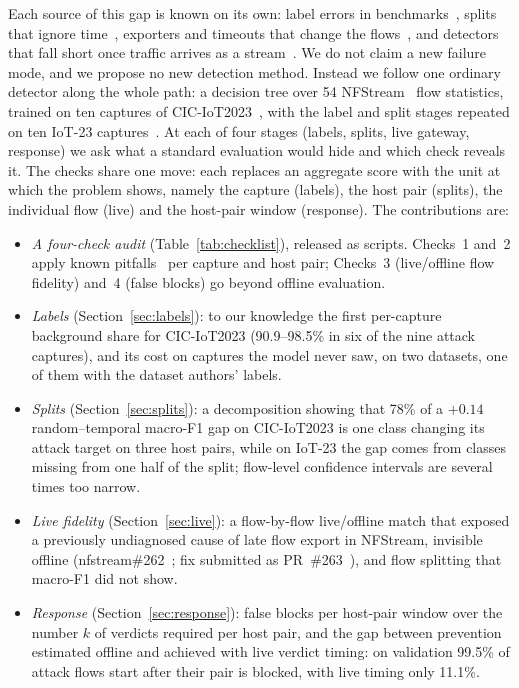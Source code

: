 Each source of this gap is known on its own: label errors in benchmarks~\cite{engelen2021troubleshooting,liu2022error,lanvin2023errors,flood2024smells}, splits that ignore time~\cite{pendlebury2019tesseract,arp2022dos,andresini2021insomnia}, exporters and timeouts that change the flows~\cite{velan2020impact,pinto2025flowexporter}, and detectors that fall short once traffic arrives as a stream~\cite{pekar2025early,zhao2026gidseval}. We do not claim a new failure mode, and we propose no new detection method. Instead we follow one ordinary detector along the whole path: a decision tree over 54 NFStream~\cite{aouini2022nfstream} flow statistics, trained on ten captures of CIC-IoT2023~\cite{neto2023ciciot2023}, with the label and split stages repeated on ten IoT-23 captures~\cite{garcia2020iot23}. At each of four stages (labels, splits, live gateway, response) we ask what a standard evaluation would hide and which check reveals it. The checks share one move: each replaces an aggregate score with the unit at which the problem shows, namely the capture (labels), the host pair (splits), the individual flow (live) and the host-pair window (response). The contributions are:
\begin{itemize}
\item \emph{A four-check audit} (Table~\ref{tab:checklist}), released as scripts. Checks~1 and~2 apply known pitfalls~\cite{arp2022dos,flood2024smells} per capture and host pair; Checks~3 (live/offline flow fidelity) and~4 (false blocks) go beyond offline evaluation.
\item \emph{Labels} (Section~\ref{sec:labels}): to our knowledge the first per-capture background share for CIC-IoT2023 (90.9--98.5\% in six of the nine attack captures), and its cost on captures the model never saw, on two datasets, one of them with the dataset authors' labels.
\item \emph{Splits} (Section~\ref{sec:splits}): a decomposition showing that 78\% of a $+0.14$ random--temporal macro-F1 gap on CIC-IoT2023 is one class changing its attack target on three host pairs, while on IoT-23 the gap comes from classes missing from one half of the split; flow-level confidence intervals are several times too narrow.
\item \emph{Live fidelity} (Section~\ref{sec:live}): a flow-by-flow live/offline match that exposed a previously undiagnosed cause of late flow export in NFStream, invisible offline (nfstream\#262~\cite{nfstream262}; fix submitted as PR~\#263~\cite{nfstream263}), and flow splitting that macro-F1 did not show.
\item \emph{Response} (Section~\ref{sec:response}): false blocks per host-pair window over the number $k$ of verdicts required per host pair, and the gap between prevention estimated offline and achieved with live verdict timing: on validation 99.5\% of attack flows start after their pair is blocked, with live timing only 11.1\%.
\end{itemize}

